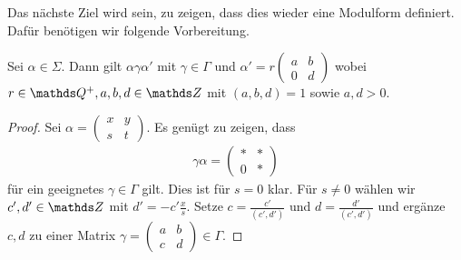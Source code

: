 Das nächste Ziel wird sein, zu zeigen, dass dies wieder eine Modulform definiert.
Dafür benötigen wir folgende Vorbereitung.
\begin{prop}
Sei $\alpha \in \Sigma$. Dann gilt $\alpha \gamma \alpha'$ mit
$\gamma \in \Gamma$ und $\alpha'=r \begin{pmatrix}
a&b\\
0&d
\end{pmatrix}$
wobei $r \in \Q^+,a,b,d\in \Z$ mit $(a,b,d)=1$ sowie $a,d>0$.
\end{prop}
\begin{proof}
Sei $\alpha =\begin{pmatrix}
x&y\\
s&t
\end{pmatrix}$.
Es genügt zu zeigen, dass
\begin{align*}
\gamma \alpha =\begin{pmatrix}
\ast&\ast\\
0&\ast
\end{pmatrix}
\end{align*}
für ein geeignetes $\gamma \in \Gamma$ gilt.
Dies ist für $s=0$ klar.
Für $s\not =0$ wählen wir $c',d'\in \Z$ mit $d'=-c' \frac{x}{s}$.
Setze $c=\frac{c'}{(c',d')}$ und $d=\frac{d'}{(c',d')}$ und ergänze $c,d$ zu einer Matrix $\gamma=\begin{pmatrix}
a&b\\
c&d
\end{pmatrix}\in \Gamma$.
\end{proof}

